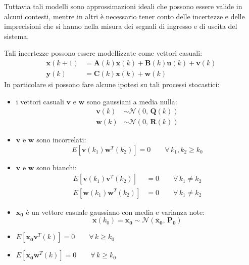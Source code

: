 \documentclass[12pt,a4paper]{article}
\newcommand*{\matr}{\mathbf}
\newcommand*{\vett}{\mathbf}
\begin{document}
Tuttavia tali modelli sono approssimazioni ideali che possono essere valide in alcuni contesti, mentre in altri è necessario tener conto delle incertezze e delle imprecisioni che si hanno nella misura dei segnali di ingresso e di uscita del sistema.

Tali incertezze possono essere modellizzate come vettori casuali:
\begin{align*}
\vett{x}(k+1) &= \matr{A}(k)\vett{x}(k) + \matr{B}(k)\vett{u}(k) + \vett{v}(k) \\
\vett{y}(k) &= \matr{C}(k)\vett{x}(k) + \vett{w}(k)
\end{align*}
In particolare si possono fare alcune ipotesi su tali processi stocastici:
\begin{itemize}
\item i vettori casuali $\vett{v}$ e $\vett{w}$ sono gaussiani a media nulla: 
\begin{align*}
 \vett{v}(k) &\sim \mathcal{N}(0,\,\matr{Q}(k)) \\
 \vett{w}(k) &\sim \mathcal{N}(0,\,\matr{R}(k))
\end{align*}
\item $\vett{v}$ e $\vett{w}$ sono incorrelati:
 \[E[\vett{v}(k_1)\vett{w}^T(k_2)]=0\qquad \forall\, k_1,k_2 \geq k_0\]
\item $\vett{v}$ e $\vett{w}$ sono bianchi: 
\begin{align*}
 E[\vett{v}(k_1)\vett{v}^T(k_2)]&=0\qquad \forall\, k_1 \neq k_2 \\
 E[\vett{w}(k_1)\vett{w}^T(k_2)]&=0\qquad \forall\, k_1 \neq k_2
\end{align*}
\item $\vett{x_0}$ è un vettore casuale gaussiano con media e varianza note:
\[\vett{x}(k_0)=\vett{x_0} \sim \mathcal{N}(\vett{\bar{x}_0},\,\matr{P_0})\]

\item $E[\vett{x_0}\vett{v}^T(k)]=0\qquad \forall\, k \geq k_0$
\item $E[\vett{x_0}\vett{w}^T(k)]=0\qquad \forall\, k \geq k_0$
\end{itemize}
\end{document}
